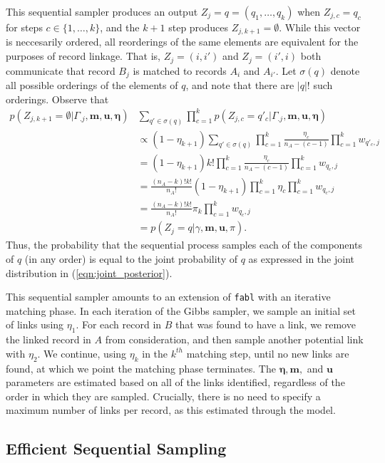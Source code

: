 \documentclass[12pt,letterpaper]{article}
\newcommand{\1}[1]{\mathbb{I}\!\left[#1\right]} %
\begin{document}
This sequential sampler produces an output $Z_j = q = (q_1, \ldots, q_k)$ when $Z_{j, c} = q_c$ for steps $c \in \{1, \ldots, k\}$, and the $k+1$ step produces $Z_{j, k+1} = \emptyset$. While this vector is neccesarily ordered, all reorderings of the same elements are equivalent for the purposes of record linkage.   That is, $Z_j = (i, i')$ and $Z_j = (i', i)$ both communicate that record $B_j$ is matched to records $A_i$ and $A_{i'}$. Let $\sigma(q)$ denote all possible orderings of the elements of $q$, and note that there are $|q|!$ such orderings. Observe that 
\begin{align}
	p(Z_{j, k+1} = \emptyset | \Gamma_{.j}, \bm{m}, \bm{u}, \bm{\eta}) &\sum_{q' \in \sigma(q)} \prod_{c = 1}^{k} p(Z_{j, c} = q'_c|\Gamma_{.j}, \bm{m}, \bm{u}, \bm{\eta}) \\
	&\propto (1 - \eta_{k+1}) \sum_{q' \in \sigma(q)} \prod_{c = 1}^{k} \frac{\eta_{c} }{n_A - (c - 1)}  \prod_{c = 1}^{k} w_{q'_c, j} \\
	&=(1 - \eta_{k+1}) k! \prod_{c = 1}^{k} \frac{\eta_{c} }{n_A - (c - 1)}  \prod_{c = 1}^{k} w_{q_c, j} \\
	&= \frac{(n_A - k)!k!}{n_A!} (1 - \eta_{k+1})\prod_{c = 1}^{k} \eta_{c} \prod_{c = 1}^{k} w_{q_c, j} \\
	&= \frac{(n_A - k)!k!}{n_A!} \pi_k \prod_{c = 1}^{k} w_{q_c, j} \\
	&= p\left(Z_j  = q |\gamma, \bm{m}, \bm{u}, \pi\right).
\end{align}
Thus, the probability that the sequential process samples each of the components of $q$ (in any order) is equal to the joint probability of $q$ as expressed in the joint distribution in (\ref{eqn:joint_posterior}).

This sequential sampler amounts to an extension of \texttt{fabl} with an iterative matching phase. In each iteration of the Gibbs sampler, we sample an initial set of links using $\eta_1$. For each record in $B$ that was found to have a link, we remove the linked record in $A$ from consideration, and then sample another potential link with $\eta_2$. We continue, using $\eta_k$ in the $k^{th}$ matching step, until no new links are found, at which we point the matching phase terminates. The $\bm{\eta}, \bm{m},$ and $\bm{u}$ parameters are estimated based on all of the links identified, regardless of the order in which they are sampled. Crucially, there is no need to specify a maximum number of links per record, as this estimated through the model.

\subsection{Efficient Sequential Sampling}\label{sec:efficient-sampling}
\end{document}
